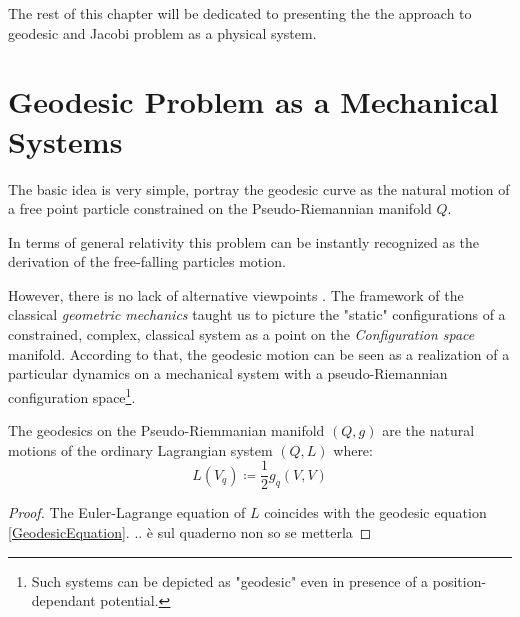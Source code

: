 \documentclass[Main]{subfiles}
\begin{document}
	
	
	
	
	The rest of this chapter will be dedicated to presenting the the approach to geodesic and Jacobi problem as a physical system.


\section{Geodesic Problem as a Mechanical Systems}\label{GeodesicMechanics}
	The basic idea is very simple, portray the geodesic curve as the natural motion of a free point particle constrained on the Pseudo-Riemannian manifold $Q$.
	
	\begin{remark}
	In terms of general relativity this problem can be instantly recognized as the derivation of the free-falling particles motion.
	
	However, there is no lack of alternative viewpoints .
	The framework of the classical \emph{geometric mechanics} taught us to picture the "static" configurations of a constrained, complex, classical system as a point on the \emph{Configuration space} manifold. According to that, the geodesic motion can be seen as a realization of a particular dynamics on a mechanical system with a pseudo-Riemannian configuration space\footnote{Such systems can be depicted as "geodesic" even in presence of a position-dependant potential.\cite[Cap 3.7]{Abraham1978}}.
	\end{remark}



	\begin{theorem}
		The geodesics on the Pseudo-Riemmanian manifold $(Q,g)$ are the natural motions of the ordinary Lagrangian system $(Q, L)$ where:
		\begin{equation}
			L(V_q) \coloneqq \frac{1}{2} g_q(V,V)
		\end{equation}
	\end{theorem}	
	\begin{proof}
		 The Euler-Lagrange equation of $L$ coincides with the geodesic equation \ref{GeodesicEquation}.
		 \danger.. è sul quaderno non so se metterla
	\end{proof}
\end{document}
